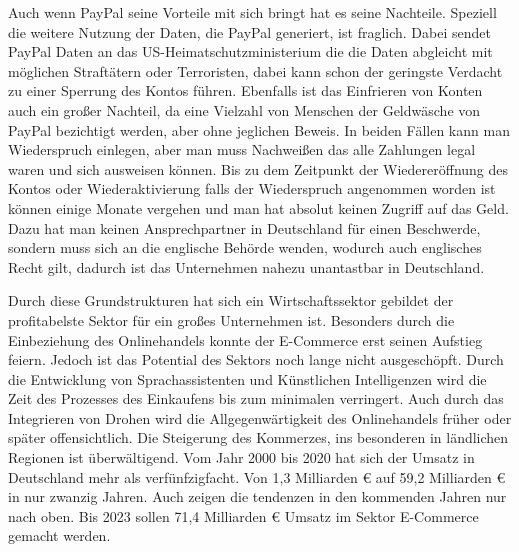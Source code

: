 
Auch wenn PayPal seine Vorteile mit sich bringt hat es seine Nachteile. Speziell die weitere Nutzung der Daten, die PayPal generiert, ist fraglich. Dabei sendet PayPal Daten an das US-Heimatschutzministerium die die Daten abgleicht mit möglichen Straftätern oder Terroristen, dabei kann schon der geringste Verdacht zu einer Sperrung des Kontos führen. %
Ebenfalls ist das Einfrieren von Konten auch ein großer Nachteil, da eine Vielzahl von Menschen der Geldwäsche von PayPal bezichtigt werden, aber ohne jeglichen Beweis. In beiden Fällen kann man Wiederspruch einlegen, aber man muss Nachweißen das alle Zahlungen legal waren und sich ausweisen können. Bis zu dem Zeitpunkt der Wiedereröffnung des Kontos oder Wiederaktivierung falls der Wiederspruch angenommen worden ist können einige Monate vergehen und man hat absolut keinen Zugriff auf das Geld. Dazu hat man keinen Ansprechpartner in Deutschland für einen Beschwerde, sondern muss sich an die englische Behörde wenden, wodurch auch englisches Recht gilt, dadurch ist das Unternehmen nahezu unantastbar in Deutschland. 




Durch diese Grundstrukturen hat sich ein Wirtschaftssektor gebildet der profitabelste Sektor für ein großes Unternehmen ist. Besonders durch die Einbeziehung des Onlinehandels konnte der E-Commerce erst seinen Aufstieg feiern. Jedoch ist das Potential des Sektors noch lange nicht ausgeschöpft. Durch die Entwicklung von Sprachassistenten und Künstlichen Intelligenzen wird die Zeit des Prozesses des Einkaufens bis zum minimalen verringert. Auch durch das Integrieren von Drohen wird die Allgegenwärtigkeit des Onlinehandels früher oder später offensichtlich. %
Die Steigerung des Kommerzes, ins besonderen in ländlichen Regionen ist überwältigend. Vom Jahr 2000 bis 2020 hat sich der Umsatz in Deutschland mehr als verfünfzigfacht. Von 1,3 Milliarden € auf 59,2 Milliarden € in nur zwanzig Jahren. %
Auch zeigen die tendenzen in den kommenden Jahren nur nach oben. Bis 2023 sollen 71,4 Milliarden € Umsatz im Sektor E-Commerce gemacht werden.       
 
